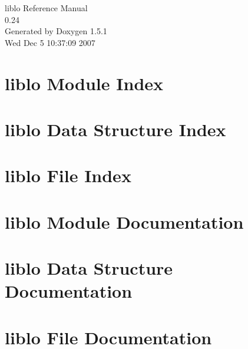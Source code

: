 \documentclass[a4paper]{book}
\begin{document}
\begin{titlepage}
\vspace*{7cm}
\begin{center}
{\Large liblo Reference Manual\\[1ex]\large 0.24 }\\
\vspace*{1cm}
{\large Generated by Doxygen 1.5.1}\\
\vspace*{0.5cm}
{\small Wed Dec 5 10:37:09 2007}\\
\end{center}
\end{titlepage}
\clearemptydoublepage
{}
\tableofcontents
\clearemptydoublepage
{}
\chapter{liblo Module Index}

\chapter{liblo Data Structure Index}

\chapter{liblo File Index}

\chapter{liblo Module Documentation}



\chapter{liblo Data Structure Documentation}


\chapter{liblo File Documentation}




\printindex
\end{document}
